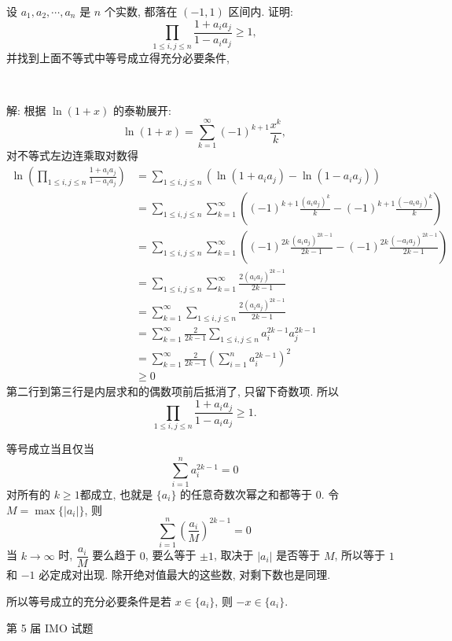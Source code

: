 \newpage
设 $a_1, a_2, \cdots, a_n$ 是 $n$ 个实数, 都落在 $(-1,1)$ 区间内. 证明:
\[\prod_{1\le i,j\le n}\frac{1+a_ia_j}{1-a_ia_j} \ge 1 ,\]
并找到上面不等式中等号成立得充分必要条件,

~

解: 根据 $\ln(1+x)$ 的泰勒展开:
\[\ln(1+x) = \sum_{k=1}^\infty (-1)^{k+1}\frac{x^k}{k} ,\]
对不等式左边连乘取对数得
\begin{align*}
\ln\left(\prod_{1\le i,j\le n}\frac{1+a_ia_j}{1-a_ia_j}\right) &= \sum_{1\le i,j\le n}\left(\ln(1+a_ia_j) - \ln(1-a_ia_j)\right)\\
&= \sum_{1\le i,j\le n} \sum_{k=1}^\infty\left( (-1)^{k+1}\frac{(a_ia_j)^k}{k} -  (-1)^{k+1}\frac{(-a_ia_j)^k}{k} \right) \\
&=  \sum_{1\le i,j\le n} \sum_{k=1}^\infty\left( (-1)^{2k}\frac{(a_ia_j)^{2k-1}}{2k-1} -  (-1)^{2k}\frac{(-a_ia_j)^{2k-1}}{2k-1} \right)\\
&= \sum_{1\le i,j\le n} \sum_{k=1}^\infty \frac{2(a_ia_j)^{2k-1}}{2k-1}\\
&= \sum_{k=1}^\infty\sum_{1\le i,j\le n} \frac{2(a_ia_j)^{2k-1}}{2k-1}\\
&= \sum_{k=1}^\infty\frac{2}{2k-1}\sum_{1\le i,j\le n}a_i^{2k-1}a_j^{2k-1}\\
&= \sum_{k=1}^\infty\frac{2}{2k-1}\left(\sum_{i = 1}^n a_i^{2k-1}\right)^2 \\
&\ge 0
\end{align*}
第二行到第三行是内层求和的偶数项前后抵消了, 只留下奇数项. 所以
\[\prod_{1\le i,j\le n}\frac{1+a_ia_j}{1-a_ia_j} \ge 1 .\]

等号成立当且仅当
\[\sum_{i = 1}^n a_i^{2k-1} = 0\]
对所有的 $k \ge 1$都成立, 也就是 $\{a_i\}$ 的任意奇数次幂之和都等于 $0$. 令 $M = \max\{ |a_i| \}$, 则
\[\sum_{i=1}^n\left(\frac{a_i}{M}\right)^{2k-1} = 0\]
当 $k\to\infty$ 时, $\dfrac{a_i}{M}$ 要么趋于 $0$, 要么等于 $\pm 1$, 取决于 $|a_i|$ 是否等于 $M$, 所以等于 $1$ 和 $-1$ 必定成对出现. 除开绝对值最大的这些数, 对剩下数也是同理. 

所以等号成立的充分必要条件是若 $x\in\{a_i\}$, 则 $-x\in\{a_i\}$.

\newpage

\noindent 第 5 届 IMO 试题

